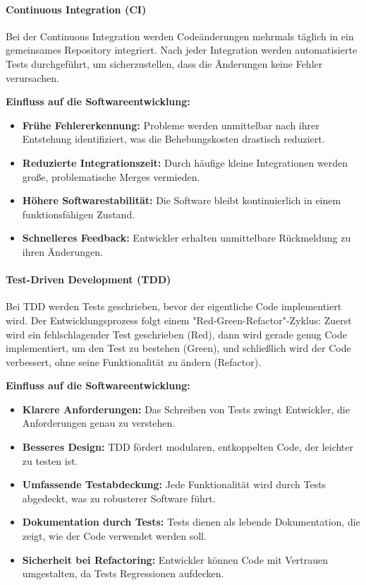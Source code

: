 \paragraph{Continuous Integration (CI)}
Bei der Continuous Integration werden Codeänderungen mehrmals täglich in ein gemeinsames Repository integriert. Nach jeder Integration werden automatisierte Tests durchgeführt, um sicherzustellen, dass die Änderungen keine Fehler verursachen.

\textbf{Einfluss auf die Softwareentwicklung:}
\begin{itemize}
    \item \textbf{Frühe Fehlererkennung:} Probleme werden unmittelbar nach ihrer Entstehung identifiziert, was die Behebungskosten drastisch reduziert.
    \item \textbf{Reduzierte Integrationszeit:} Durch häufige kleine Integrationen werden große, problematische Merges vermieden.
    \item \textbf{Höhere Softwarestabilität:} Die Software bleibt kontinuierlich in einem funktionsfähigen Zustand.
    \item \textbf{Schnelleres Feedback:} Entwickler erhalten unmittelbare Rückmeldung zu ihren Änderungen.
\end{itemize}

\paragraph{Test-Driven Development (TDD)}
Bei TDD werden Tests geschrieben, bevor der eigentliche Code implementiert wird. Der Entwicklungsprozess folgt einem "Red-Green-Refactor"-Zyklus: Zuerst wird ein fehlschlagender Test geschrieben (Red), dann wird gerade genug Code implementiert, um den Test zu bestehen (Green), und schließlich wird der Code verbessert, ohne seine Funktionalität zu ändern (Refactor).

\textbf{Einfluss auf die Softwareentwicklung:}
\begin{itemize}
    \item \textbf{Klarere Anforderungen:} Das Schreiben von Tests zwingt Entwickler, die Anforderungen genau zu verstehen.
    \item \textbf{Besseres Design:} TDD fördert modularen, entkoppelten Code, der leichter zu testen ist.
    \item \textbf{Umfassende Testabdeckung:} Jede Funktionalität wird durch Tests abgedeckt, was zu robusterer Software führt.
    \item \textbf{Dokumentation durch Tests:} Tests dienen als lebende Dokumentation, die zeigt, wie der Code verwendet werden soll.
    \item \textbf{Sicherheit bei Refactoring:} Entwickler können Code mit Vertrauen umgestalten, da Tests Regressionen aufdecken.
\end{itemize}

